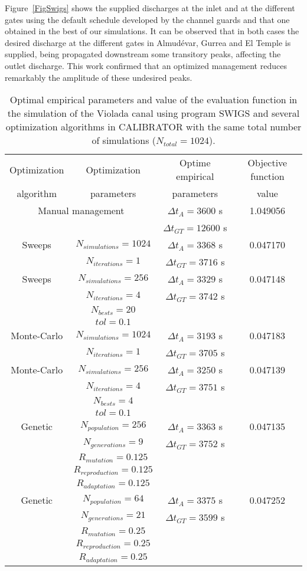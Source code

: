 \documentclass[review,authoryear]{elsarticle}
\newcommand{\TABLE}[5]
{
	\begin{table}[ht!]
		\centering
		\caption{#4.\label{#5}}
		#1
		\begin{tabular}{#2}
			#3
		\end{tabular}
	\end{table}
}
\begin{document}
Figure~\ref{FigSwigs} shows the supplied discharges at the inlet and at the different
gates using the default schedule developed by the channel guards and that one 
obtained in the best of our simulations. It can be observed that in both cases 
the desired discharge at the different gates in Almudévar, Gurrea and El Temple is supplied,
being propagated downstream some transitory peaks, affecting the outlet discharge.
This work confirmed that an optimized management reduces remarkably the amplitude of
these undesired peaks.

\TABLE{\scriptsize}{cccc}
{
	Optimization & Optimization & Optime empirical & Objective function
	\\ algorithm & parameters & parameters & value
	\\ \hline
	\multicolumn{2}{c}{Manual management} & $\Delta t_A=3600$ s & 1.049056
	\\ & & $\Delta t_{GT}=12600$ s
	\\ \hline
	Sweeps & $N_{simulations}=1024$ & $\Delta t_A=3368$ s & 0.047170
	\\ & $N_{iterations}=1$ & $\Delta t_{GT}=3716$ s
	\\ \hline
	Sweeps & $N_{simulations}=256$ & $\Delta t_A=3329$ s & 0.047148
	\\ & $N_{iterations}=4$ & $\Delta t_{GT}=3742$ s
	\\ & $N_{bests}=20$ &
	\\ & $tol=0.1$
	\\ \hline
	Monte-Carlo & $N_{simulations}=1024$ & $\Delta t_A=3193$ s & 0.047183
	\\ & $N_{iterations}=1$ & $\Delta t_{GT}=3705$ s
	\\ \hline
	Monte-Carlo & $N_{simulations}=256$ & $\Delta t_A=3250$ s & 0.047139
	\\ & $N_{iterations}=4$ & $\Delta t_{GT}=3751$ s
	\\ & $N_{bests}=4$
	\\ & $tol=0.1$
	\\ \hline
	Genetic & $N_{population}=256$ & $\Delta t_A=3363$ s & 0.047135
	\\ & $N_{generations}=9$ & $\Delta t_{GT}=3752$ s
	\\ & $R_{mutation}=0.125$
	\\ & $R_{reproduction}=0.125$
	\\ & $R_{adaptation}=0.125$
	\\ \hline
	Genetic & $N_{population}=64$ & $\Delta t_A=3375$ s & 0.047252
	\\ & $N_{generations}=21$ & $\Delta t_{GT}=3599$ s
	\\ & $R_{mutation}=0.25$
	\\ & $R_{reproduction}=0.25$
	\\ & $R_{adaptation}=0.25$
	\\ \hline
}{Optimal empirical parameters and value of the evaluation function in the simulation of the Violada canal using program SWIGS and several optimization algorithms in CALIBRATOR with the same total number of simulations ($N_{total}=1024$)}
{TabSwigs}
\end{document}
